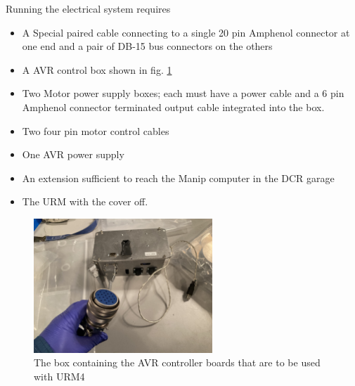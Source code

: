 \documentclass[11pt]{article}
\begin{document}
Running the electrical system requires
\begin{itemize}
\item A Special paired cable connecting to a single 20 pin Amphenol connector at one end and a pair of DB-15 bus connectors on the others
\item A AVR control box shown in fig. \ref{fig:AVRUnit}
\item Two Motor power supply boxes; each must have a power cable and a 6 pin Amphenol connector terminated output cable integrated into the box.
\item Two four pin motor control cables
\item One AVR power supply
\item An extension sufficient to reach the Manip computer in the DCR garage
\item The URM with the cover off.
\end{itemize}

\begin{figure}
  \begin{center}
    \includegraphics[width=0.6\textwidth]{AVRBox}
  \end{center}
  \caption{The box containing the AVR controller boards that are to be used with URM4}
  \label{fig:AVRUnit}
\end{figure}
  
\end{document}
